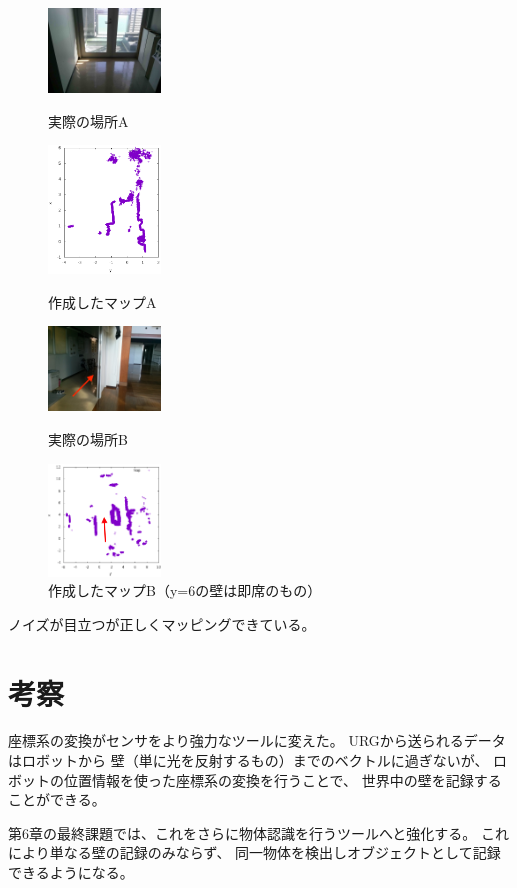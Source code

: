 \documentclass[main]{subfiles}
\begin{document}
\begin{figure}[H]
	\centering
	\begin{minipage}{0.2\hsize}
		\includegraphics[width=3cm]{img/photo_28.jpg}
		\caption{実際の場所A}
	\end{minipage}
	\begin{minipage}{0.28\hsize}
		\includegraphics[width=3cm]{img/28.png}
		\caption{作成したマップA}
	\end{minipage}
	\begin{minipage}{0.2\hsize}
		\includegraphics[width=3cm]{img/photo_ga.jpg}
		\caption{実際の場所B}
	\end{minipage}
	\begin{minipage}{0.29\hsize}
		\includegraphics[width=3cm]{img/ma.png}
		\caption{作成したマップB（y=6の壁は即席のもの）}
	\end{minipage}
\end{figure}

ノイズが目立つが正しくマッピングできている。

\section{考察}
座標系の変換がセンサをより強力なツールに変えた。
URGから送られるデータはロボットから
壁（単に光を反射するもの）までのベクトルに過ぎないが、
ロボットの位置情報を使った座標系の変換を行うことで、
世界中の壁を記録することができる。

第6章の最終課題では、これをさらに物体認識を行うツールへと強化する。
これにより単なる壁の記録のみならず、
同一物体を検出しオブジェクトとして記録できるようになる。
\end{document}
